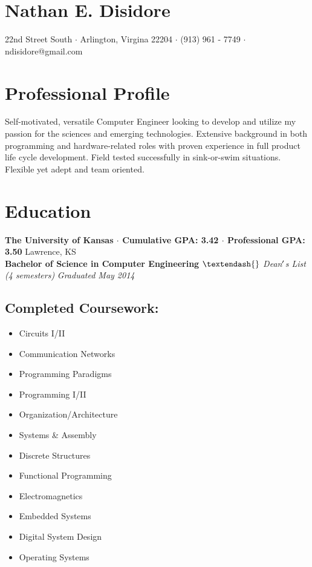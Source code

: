 \documentclass[10pt]{article}
\newcommand{\startsquarepar}{\par\begingroup \parfillskip 0pt \relax}
\newcommand{\stopsquarepar}{\par\endgroup}
\newenvironment{ninept}{\fontsize{10}{12}\selectfont}{\par}
\begin{document}
\pagestyle{empty} %

\section*{\Huge Nathan E. Disidore}
\startsquarepar
  3429 22nd Street South $\cdot$ Arlington, Virgina 22204 $\cdot$ (913) 961 - 7749 $\cdot$ ndisidore@gmail.com
\stopsquarepar

\section*{Professional Profile}
Self-motivated, versatile Computer Engineer looking to develop and utilize my passion for the sciences and emerging technologies. Extensive background in both programming and hardware-related roles with proven experience in full product life cycle development. Field tested successfully in sink-or-swim situations. Flexible yet adept and team oriented.

\section*{Education}
\textbf{The University of Kansas $\cdot$ Cumulative GPA: 3.42 $\cdot$ Professional GPA: 3.50}
\hfill
Lawrence, KS \\
\textbf{Bachelor of Science in Computer Engineering}
\textit{$\textendash{}$ Dean$\rq$s List (4 semesters)}
\hfill
\textit{Graduated May 2014}
\subsection*{Completed Coursework:}
\begin{ninept}
  \begin{multicols}{4}
    \begin{itemize}
      \item Circuits I/II
      \item Communication Networks
      \item Programming Paradigms
      \item Programming I/II
      \item Organization/Architecture
      \item Systems \& Assembly
      \item Discrete Structures
      \item Functional Programming
      \item Electromagnetics
      \item Embedded Systems
      \item Digital System Design
      \item Operating Systems
    \end{itemize}
  \end{multicols}
\end{ninept}
\end{document}
